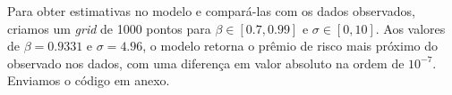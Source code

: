 \documentclass{article}
\begin{document}
Para obter estimativas no modelo e compará-las com os dados observados,
criamos um \textit{grid} de 1000 pontos para $\beta \in [0.7, 0.99]$ e $\sigma \in [0, 10]$.
Aos valores de $\beta  = 0.9331$ e $\sigma = 4.96$, o modelo retorna o prêmio de risco
mais próximo do observado nos dados, com uma diferença em valor absoluto na 
ordem de $10^{-7}$. Enviamos o código em anexo.
\end{document}
